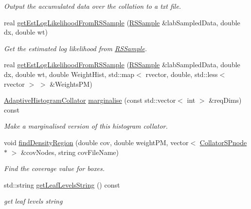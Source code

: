 \begin{DoxyCompactItemize}
\begin{DoxyCompactList}\small\item\em \-Output the accumulated data over the collation to a txt file. \end{DoxyCompactList}\item 
real \hyperlink{classsubpavings_1_1AdaptiveHistogramCollator_afd34a4c6b449b8f870b6414e7a1c9ef5}{get\-Est\-Log\-Likelihood\-From\-R\-S\-Sample} (\hyperlink{classRSSample}{\-R\-S\-Sample} \&lab\-Sampled\-Data, double dx, double wt)
\begin{DoxyCompactList}\small\item\em \-Get the estimated log likelihood from \hyperlink{classRSSample}{\-R\-S\-Sample}. \end{DoxyCompactList}\item 
real \hyperlink{classsubpavings_1_1AdaptiveHistogramCollator_a2c32c30f302a52df863a05f852dd7ea8}{get\-Est\-Log\-Likelihood\-From\-R\-S\-Sample} (\hyperlink{classRSSample}{\-R\-S\-Sample} \&lab\-Sampled\-Data, double dx, double wt, double \-Weight\-Hist, std\-::map$<$ rvector, double, std\-::less$<$ rvector $>$ $>$ \&\-Weights\-P\-M)
\item 
\hyperlink{classsubpavings_1_1AdaptiveHistogramCollator}{\-Adaptive\-Histogram\-Collator} \hyperlink{classsubpavings_1_1AdaptiveHistogramCollator_a2f8ce51da9658ebc8a10a7823366d8ab}{marginalise} (const std\-::vector$<$ int $>$ \&req\-Dims) const 
\begin{DoxyCompactList}\small\item\em \-Make a marginalised version of this histogram collator. \end{DoxyCompactList}\item 
void \hyperlink{classsubpavings_1_1AdaptiveHistogramCollator_a2f477d16af1646398813009e1dabe2c2}{find\-Density\-Region} (double cov, double weight\-P\-M, vector$<$ \hyperlink{classsubpavings_1_1CollatorSPnode}{\-Collator\-S\-Pnode} $\ast$ $>$ \&cov\-Nodes, string cov\-File\-Name)
\begin{DoxyCompactList}\small\item\em \-Find the coverage value for boxes. \end{DoxyCompactList}\item 
std\-::string \hyperlink{classsubpavings_1_1AdaptiveHistogramCollator_a2a2da27e64f75b4080d6a967544872e0}{get\-Leaf\-Levels\-String} () const 
\begin{DoxyCompactList}\small\item\em get leaf levels string \end{DoxyCompactList}\item 

\end{DoxyCompactItemize}
